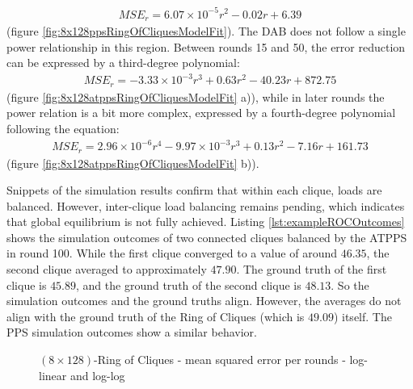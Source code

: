 \begin{align}
    MSE_r=6.07\times 10^{-5}r^{2}-0.02r+6.39    
\end{align}
(figure \ref{fig:8x128ppsRingOfCliquesModelFit}). The DAB does not follow a single power relationship in this region. Between rounds 15 and 50, the error reduction can be expressed by a third-degree polynomial:
\begin{align}
    MSE_r=-3.33\times 10^{-3}r^{3}+0.63r^{2}-40.23r+872.75    
\end{align}
(figure \ref{fig:8x128atppsRingOfCliquesModelFit} a)), while in later rounds the power relation is a bit more complex, expressed by a fourth-degree polynomial following the equation:
\begin{align}
    MSE_r=2.96 \times 10^{-6}r^{4}-9.97\times 10^{-3}r^{3}+0.13r^{2}-7.16r+161.73    
\end{align}
(figure \ref{fig:8x128atppsRingOfCliquesModelFit} b)).

Snippets of the simulation results confirm that within each clique, loads are balanced. However, inter-clique load balancing remains pending, which indicates that global equilibrium is not fully achieved. Listing \ref{lst:exampleROCOutcomes} shows the simulation outcomes of two connected cliques balanced by the ATPPS in round 100. While the first clique converged to a value of around $46.35$, the second clique averaged to approximately $47.90$. The ground truth of the first clique is $45.89$, and the ground truth of the second clique is $48.13$. So the simulation outcomes and the ground truths align. However, the averages do not align with the ground truth of the Ring of Cliques (which is $49.09$) itself. The PPS simulation outcomes show a similar behavior.

\begin{figure}[!ht]
    \centering
    \hfil
    \caption{$(8\times128)$-Ring of Cliques - mean squared error per rounds - log-linear and log-log}
        \label{fig:8x128RingOfCliquesLog_LogLog}
\end{figure}


